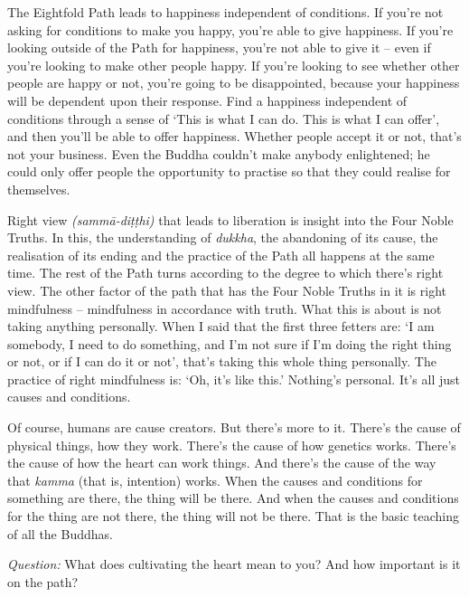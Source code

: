 The Eightfold Path leads to happiness independent of conditions. If you're not
asking for conditions to make you happy, you're able to give happiness. If
you're looking outside of the Path for happiness, you're not able to give it --
even if you're looking to make other people happy. If you're looking to see
whether other people are happy or not, you're going to be disappointed, because
your happiness will be dependent upon their response. Find a happiness
independent of conditions through a sense of `This is what I can do. This is
what I can offer', and then you'll be able to offer happiness. Whether people
accept it or not, that's not your business. Even the Buddha couldn't make
anybody enlightened; he could only offer people the opportunity to practise so
that they could realise for themselves.

Right view \emph{(sammā-diṭṭhi)} that leads to liberation is insight
into the Four Noble Truths. In this, the understanding of \emph{dukkha}, the
abandoning of its cause, the realisation of its ending and the practice of the
Path all happens at the same time. The rest of the Path turns according to the
degree to which there's right view. The other factor of the path that has the
Four Noble Truths in it is right mindfulness -- mindfulness in accordance with
truth. What this is about is not taking anything personally. When I said that
the first three fetters are: `I am somebody, I need to do something, and I'm not
sure if I'm doing the right thing or not, or if I can do it or not', that's
taking this whole thing personally. The practice of right mindfulness is: `Oh,
it's like this.' Nothing's personal. It's all just causes and conditions.

Of course, humans are cause creators. But there's more to it. There's the cause
of physical things, how they work. There's the cause of how genetics works.
There's the cause of how the heart can work things. And there's the cause of the
way that \emph{kamma} (that is, intention) works. When the causes and conditions
for something are there, the thing will be there. And when the causes and
conditions for the thing are not there, the thing will not be there. That is the
basic teaching of all the Buddhas.

\bigskip

\emph{Question:} What does cultivating the heart mean to you? And how important is it
on the path?

